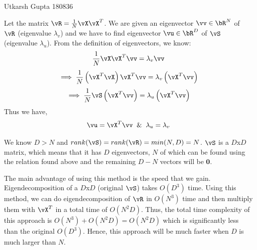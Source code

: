 \documentclass[a4paper,12pt]{article}
\begin{document}
{Utkarsh Gupta}   %
{180836}	%

\begin{mlsolution}

Let the matrix $\vR = \frac{1}{N}\vX\vX^T$. We are given an eigenvector $\vv \in \bR^N$ of $\vR$ (eigenvalue $\lambda_v$) and we have to find eigenvector $\vu \in \bR^D$ of $\vS$ (eigenvalue $\lambda_u$).
From the definition of eigenvectors, we know:
\begin{equation*}
    \frac{1}{N}\vX\vX^T\vv = \lambda_v\vv
\end{equation*}
\begin{equation*}
    \implies \frac{1}{N}\br{\vX^T\vX}\vX^T\vv = \lambda_v\br{\vX^T\vv}
\end{equation*}
\begin{equation*}
    \implies \frac{1}{N}\vS\br{\vX^T\vv} = \lambda_u\br{\vX^T\vv}
\end{equation*}
Thus we have,
\begin{equation*}
    \vu = \vX^T\vv \; \; \& \; \; \lambda_u = \lambda_v
\end{equation*}

We know $D>N$ and $rank(\vS) = rank(\vR) = min(N, D) = N$. $\vS$ is a $D$x$D$ matrix, which means that it has $D$ eigenvectors, $N$ of which can be found using the relation found above and the remaining $D-N$ vectors will be $\pmb{0}$.

The main advantage of using this method is the speed that we gain. Eigendecomposition of a $D$x$D$ (original $\vS$) takes $O(D^3)$ time. Using this method, we can do eigendecomposition of $\vR$ in $O(N^3)$ time and then multiply them with $\vX^T$ in a total time of $O(N^2D)$.
Thus, the total time complexity of this approach is $O(N^3)+O(N^2D) = O(N^2D)$ which is significantly less than the original $O(D^3)$. Hence, this approach will be much faster when $D$ is much larger than $N$.

\end{mlsolution}
\end{document}
